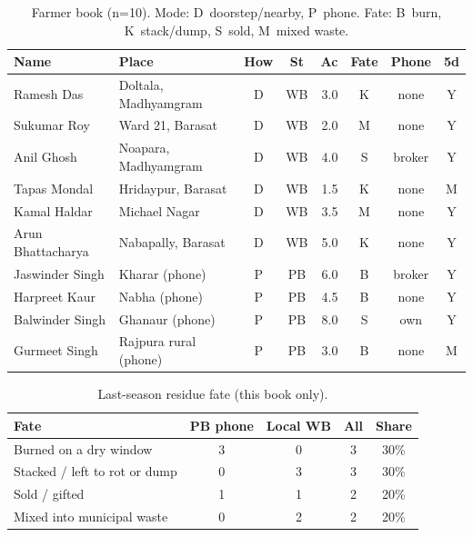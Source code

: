 \documentclass[12pt,a4paper]{article}
\begin{document}
\begin{table}[h]
\centering
\caption{Farmer book (n=10). Mode: D~doorstep/nearby, P~phone. Fate: B~burn, K~stack/dump, S~sold, M~mixed waste.}
\label{tab:roster}
\scriptsize
\begin{tabularx}{\textwidth}{@{}>{\raggedright\arraybackslash}X>{\raggedright\arraybackslash}Xccrccc@{}}
\toprule
\textbf{Name} & \textbf{Place} & \textbf{How} & \textbf{St} & \textbf{Ac} & \textbf{Fate} & \textbf{Phone} & \textbf{5d} \\
\midrule
Ramesh Das & Doltala, Madhyamgram & D & WB & 3.0 & K & none & Y \\
Sukumar Roy & Ward 21, Barasat & D & WB & 2.0 & M & none & Y \\
Anil Ghosh & Noapara, Madhyamgram & D & WB & 4.0 & S & broker & Y \\
Tapas Mondal & Hridaypur, Barasat & D & WB & 1.5 & K & none & M \\
Kamal Haldar & Michael Nagar & D & WB & 3.5 & M & none & Y \\
Arun Bhattacharya & Nabapally, Barasat & D & WB & 5.0 & K & none & Y \\
Jaswinder Singh & Kharar (phone) & P & PB & 6.0 & B & broker & Y \\
Harpreet Kaur & Nabha (phone) & P & PB & 4.5 & B & none & Y \\
Balwinder Singh & Ghanaur (phone) & P & PB & 8.0 & S & own & Y \\
Gurmeet Singh & Rajpura rural (phone) & P & PB & 3.0 & B & none & M \\
\bottomrule
\end{tabularx}
\end{table}

\begin{table}[h]
\centering
\caption{Last-season residue fate (this book only).}
\label{tab:fate}
\small
\begin{tabularx}{\textwidth}{@{}>{\raggedright\arraybackslash}Xcccc@{}}
\toprule
\textbf{Fate} & \textbf{PB phone} & \textbf{Local WB} & \textbf{All} & \textbf{Share} \\
\midrule
Burned on a dry window & 3 & 0 & 3 & 30\% \\
Stacked / left to rot or dump & 0 & 3 & 3 & 30\% \\
Sold / gifted & 1 & 1 & 2 & 20\% \\
Mixed into municipal waste & 0 & 2 & 2 & 20\% \\
\bottomrule
\end{tabularx}
\end{table}
\end{document}
